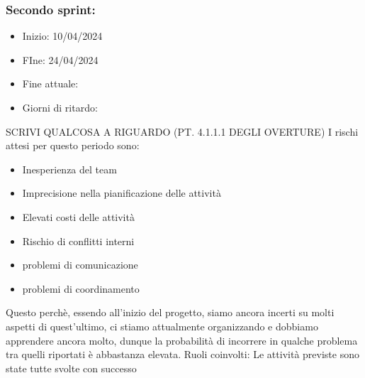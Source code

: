     \subsubsection{Secondo sprint:}
    \begin{itemize}
        \item Inizio: 10/04/2024
        \item FIne: 24/04/2024
        \item Fine attuale:
        \item Giorni di ritardo:
    \end{itemize}
    SCRIVI QUALCOSA A RIGUARDO (PT. 4.1.1.1 DEGLI OVERTURE)
    I rischi attesi per questo periodo sono:
    \begin{itemize}
        \item Inesperienza del team
        \item Imprecisione nella pianificazione delle attività
        \item Elevati costi delle attività
        \item Rischio di conflitti interni 
        \item problemi di comunicazione
        \item problemi di coordinamento
    \end{itemize}
    Questo perchè, essendo all’inizio del progetto, siamo ancora incerti su molti aspetti di quest’ultimo, ci stiamo attualmente organizzando e dobbiamo apprendere ancora molto, dunque la probabilità di incorrere in qualche problema tra quelli riportati è abbastanza elevata.
    Ruoli coinvolti: 
    Le attività previste sono state tutte svolte con successo


